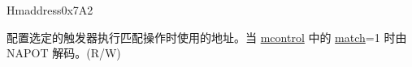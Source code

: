\begin{register}{H}{maddress}{0x7A2}\label{regdesc:MADDRESS}
%
\regnewline%
\begin{regdesc}\begin{reglist}
\label{fielddesc:MADDRESS}\item [maddress] 配置选定的触发器执行匹配操作时使用的地址。当 \hyperref[regdesc:MCONTROL]{mcontrol} 中的 \hyperref[fielddesc:MCONTROLMATCH]{match}=1 时由 NAPOT 解码。(R/W)
\end{reglist}\end{regdesc}
\end{register}
